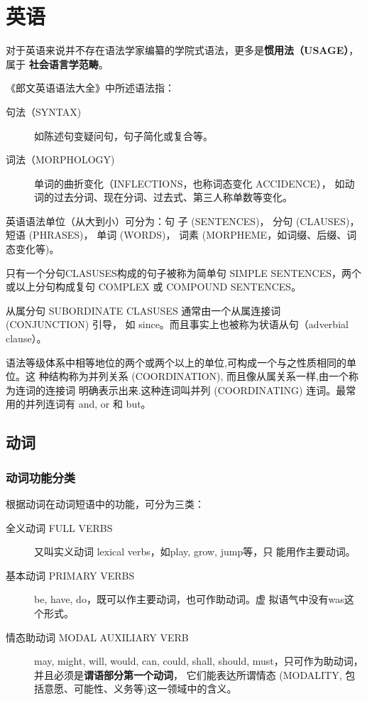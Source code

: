 \chapter{英语}

对于英语来说并不存在语法学家编纂的学院式语法，更多是\textbf{惯用法（USAGE）}，属于
\textbf{社会语言学范畴}。

《郎文英语语法大全》中所述语法指：
\begin{description}
\item [句法（SYNTAX)] 如陈述句变疑问句，句子简化或复合等。
\item [词法（MORPHOLOGY)] 单词的曲折变化（INFLECTIONS，也称词态变化 ACCIDENCE），
  如动词的过去分词、现在分词、过去式、第三人称单数等变化。
\end{description}

英语语法单位（从大到小）可分为：句
子 (SENTENCES)， 分句 (CLAUSES)， 短语 (PHRASES)， 单词 (WORDS)， 词素
(MORPHEME，如词缀、后缀、词态变化等)。

只有一个分句CLASUSES构成的句子被称为简单句 SIMPLE SENTENCES，两个或以上分句构成复句
COMPLEX 或 COMPOUND SENTENCES。

从属分句 SUBORDINATE CLASUSES 通常由一个从属连接词 (CONJUNCTION) 引导，
如 since。而且事实上也被称为状语从句（adverbial clause）。

语法等级体系中相等地位的两个或两个以上的单位,可构成一个与之性质相同的单位。这
种结构称为并列关系 (COORDINATION), 而且像从属关系一样,由一个称为连词的连接词
明确表示出来.这种连词叫并列 (COORDINATING) 连词。最常用的并列连词有 and, or
和 but。


\section{动词}

\subsection{动词功能分类}

根据动词在动词短语中的功能，可分为三类：
\begin{description}
\item[全义动词 FULL VERBS] 又叫实义动词 lexical verbs，如play, grow, jump等，只
  能用作主要动词。
\item[基本动词 PRIMARY VERBS] be, have, do，既可以作主要动词，也可作助动词。虚
  拟语气中没有was这个形式。
\item[情态助动词 MODAL AUXILIARY VERB] may, might, will, would, can, could,
  shall, should, must，只可作为助动词，并且必须是\textbf{谓语部分第一个动词}，
  它们能表达所谓情态 (MODALITY, 包括意愿、可能性、义务等)这一领域中的含义。

\end{description}

